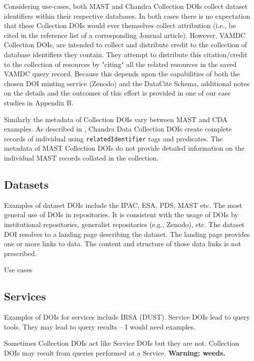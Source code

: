 \documentclass[11pt,a4paper]{ivoa}
\begin{document}
Considering use-cases, both MAST and Chandra Collection DOIs collect dataset identifiers within their respective databases.
In both cases there is no expectation that these Collection DOIs would ever themselves collect attribution (i.e., be cited in the reference list of a corresponding Journal article).
However, VAMDC Collection DOIs, are intended to collect and distribute credit to the collection of database identifiers they contain.
They attempt to distribute this citation/credit to the collection of resources by "citing" all the related resources in the saved VAMDC query record.
Because this depends upon the capabilities of both the chosen DOI minting service (Zenodo) and the DataCite Schema, additional  notes on the details and the outcomes of this effort is provided in one of our case studies in Appendix B. 

Similarly the metadata of Collection DOIs vary between MAST and CDA examples. 
As described in \citet{2023ChNew..34....5D}, Chandra Data Collection DOIs create complete records of individual using \texttt{relatedIdentifier} tags and predicates. 
The metadata of MAST Collection DOIs do not provide detailed information on the individual MAST records collated in the collection.


\subsection{Datasets}
\label{sec:intro:datasets}

Examples of dataset DOIs include the IPAC, ESA, PDS, MAST etc. 
The most general use of DOIs in repositories.
It is consistent with the usage of DOIs by institutional repositories, generalist repositories (e.g., Zenodo), etc.
The dataset DOI resolves to a landing page describing the dataset.
The landing page provides one or more links to data.
The content and structure of those data links is not prescribed. 

Use cases 

\subsection{Services}
\label{sec:intro:services}

Examples of DOIs for services include IRSA (DUST).
Service DOIs lead to query tools.
They may lead to query results -- I would need examples.

Sometimes Collection DOIs act like Service DOIs but they are not.
Collection DOIs may result from queries performed at a Service.
\textbf{Warning: weeds.}
\end{document}
